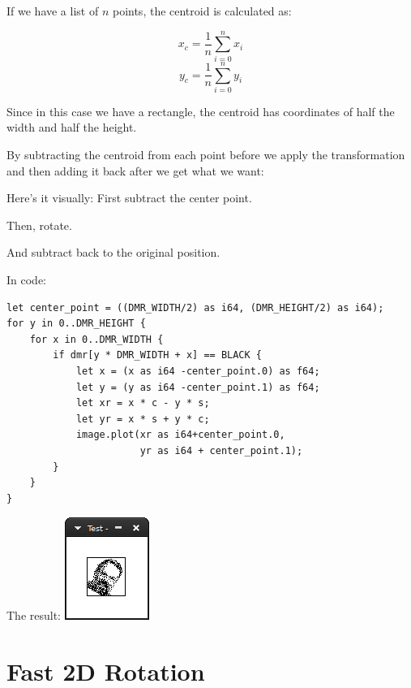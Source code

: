 \documentclass[12pt,a4,oneside,usenames,dvipsnames]{book}
\begin{document}
If we have a list of $n$ points, the centroid is calculated as:

$$ x_c = \frac{1}{n}\sum_{i=0}^{n} x_i $$
$$ y_c = \frac{1}{n}\sum_{i=0}^{n} y_i $$

Since in this case we have a rectangle, the centroid has coordinates of half the width and half the height.

By subtracting the centroid from each point before we apply the transformation and then adding it back after we get what we want:

Here's it visually: First subtract the center point.

\begin{center}
  \def\svgscale{0.6}

\end{center}

Then, rotate.

\begin{center}
  \def\svgscale{0.6}

\end{center}

And subtract back to the original position.

\begin{center}
  \def\svgscale{0.6}

\end{center}

In code:

\begin{verbatim}
let center_point = ((DMR_WIDTH/2) as i64, (DMR_HEIGHT/2) as i64);
for y in 0..DMR_HEIGHT {
    for x in 0..DMR_WIDTH {
        if dmr[y * DMR_WIDTH + x] == BLACK {
            let x = (x as i64 -center_point.0) as f64;
            let y = (y as i64 -center_point.1) as f64;
            let xr = x * c - y * s;
            let yr = x * s + y * c;
            image.plot(xr as i64+center_point.0,
                       yr as i64 + center_point.1);
        }
    }
}
\end{verbatim}

The result: \includegraphics{figures/ch11-3.png}

\section{Fast 2D Rotation}
\end{document}
